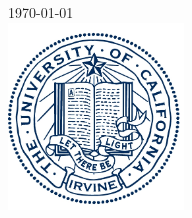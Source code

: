 \documentclass[12pt]{article}
\begin{document}
\begin{titlepage}

{\large \today}\\[2cm] %


\includegraphics[width=0.35\textwidth]{pics/logo.jpg}


\vfill %

\end{titlepage}






\small

\normalsize
%
\end{document}

